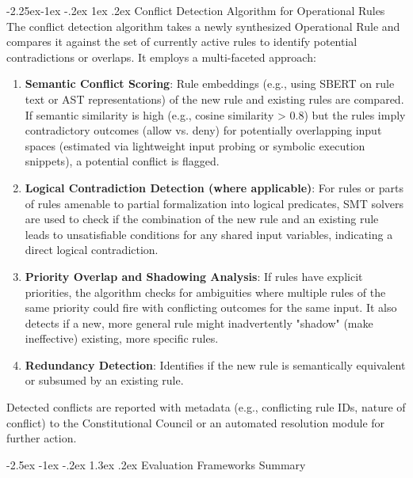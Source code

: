 \documentclass[manuscript,screen,review,anonymous,9pt]{acmart}
\makeatletter
\renewcommand\section{\@startsection{section}{1}{\z@}%
  {-2.5ex \@plus -1ex \@minus -.2ex}%
  {1.3ex \@plus.2ex}%
  {\normalfont\Large\bfseries}}
\renewcommand\subsection{\@startsection{subsection}{2}{\z@}%
  {-2.25ex\@plus -1ex \@minus -.2ex}%
  {1ex \@plus .2ex}%
  {\normalfont\large\bfseries}}
\makeatother
\begin{document}
\subsection{Conflict Detection Algorithm for Operational Rules}
The conflict detection algorithm takes a newly synthesized Operational Rule and compares it against the set of currently active rules to identify potential contradictions or overlaps. It employs a multi-faceted approach:
\begin{enumerate}[leftmargin=*,itemsep=1pt,parsep=1pt]
    \item \textbf{Semantic Conflict Scoring}: Rule embeddings (e.g., using SBERT on rule text or AST representations) of the new rule and existing rules are compared. If semantic similarity is high (e.g., cosine similarity > 0.8) but the rules imply contradictory outcomes (allow vs. deny) for potentially overlapping input spaces (estimated via lightweight input probing or symbolic execution snippets), a potential conflict is flagged.
    \item \textbf{Logical Contradiction Detection (where applicable)}: For rules or parts of rules amenable to partial formalization into logical predicates, SMT solvers are used to check if the combination of the new rule and an existing rule leads to unsatisfiable conditions for any shared input variables, indicating a direct logical contradiction.
    \item \textbf{Priority Overlap and Shadowing Analysis}: If rules have explicit priorities, the algorithm checks for ambiguities where multiple rules of the same priority could fire with conflicting outcomes for the same input. It also detects if a new, more general rule might inadvertently "shadow" (make ineffective) existing, more specific rules.
    \item \textbf{Redundancy Detection}: Identifies if the new rule is semantically equivalent or subsumed by an existing rule.
\end{enumerate}
Detected conflicts are reported with metadata (e.g., conflicting rule IDs, nature of conflict) to the Constitutional Council or an automated resolution module for further action.

\section{Evaluation Frameworks Summary}
\label{app:evaluation}
\end{document}
